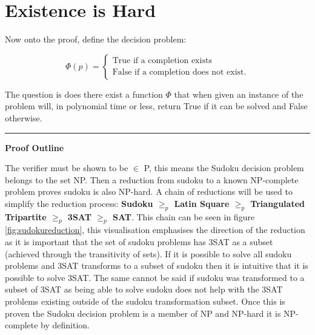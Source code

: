 \documentclass[a4paper,11pt]{report}
\begin{document}

\section{Existence is Hard}
Now onto the proof, define the decision problem:

\begin{equation}
\Phi (p) = \begin{cases}
\text{True if a completion exists} \\
\text{False if a completion does not exist}.
\end{cases}
\end{equation}

The question is does there exist a function $\Phi$ that when given an instance of the problem will, in polynomial time or less,
return True if it can be solved and False otherwise.

\noindent\rule{4cm}{0.4pt}

\textbf{Proof Outline}

The verifier must be shown to be $\in$ P, this means the Sudoku decision problem belongs to the set NP. Then a reduction from sudoku to a known NP-complete problem proves sudoku is also NP-hard. A chain of reductions will be used to simplify the reduction process: \textbf{Sudoku $\geq_p$ Latin Square $\geq_p$ Triangulated Tripartite $\geq_p$ 3SAT $\geq_p$ SAT}. This chain can be seen in figure \ref{fig:sudokureduction}, this visualisation emphasises the direction of the reduction as it is important that the set of sudoku problems has 3SAT as a subset (achieved through the transitivity of sets). If it is possible to solve all sudoku problems and 3SAT transforms to a subset of sudoku then it is intuitive that it is possible to solve 3SAT. The same cannot be said if sudoku was transformed to a subset of 3SAT as being able to solve sudoku does not help with the 3SAT problems existing outside of the sudoku transformation subset. Once this is proven the Sudoku decision problem is a member of NP and NP-hard it is NP-complete by definition.
\end{document}
